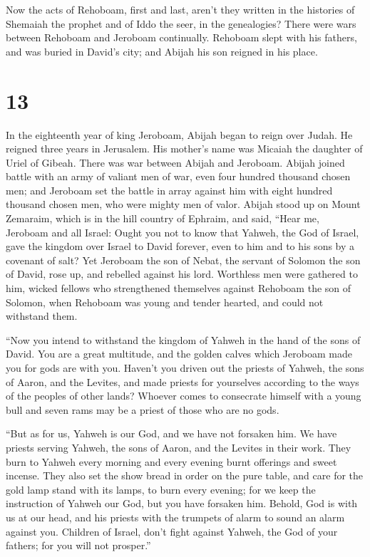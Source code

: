 Now the acts of Rehoboam, first and last, aren't they
written in the histories of Shemaiah the prophet and of Iddo the seer,
in the genealogies? There were wars between Rehoboam and Jeroboam
continually.  Rehoboam slept with his fathers, and was
buried in David's city; and Abijah his son reigned in his place.

\hypertarget{section-12}{%
\section{13}\label{section-12}}

 In the eighteenth year of king Jeroboam, Abijah began to
reign over Judah.  He reigned three years in Jerusalem.
His mother's name was Micaiah the daughter of Uriel of Gibeah. There was
war between Abijah and Jeroboam.  Abijah joined battle
with an army of valiant men of war, even four hundred thousand chosen
men; and Jeroboam set the battle in array against him with eight hundred
thousand chosen men, who were mighty men of valor.  Abijah
stood up on Mount Zemaraim, which is in the hill country of Ephraim, and
said, ``Hear me, Jeroboam and all Israel:  Ought you not
to know that Yahweh, the God of Israel, gave the kingdom over Israel to
David forever, even to him and to his sons by a covenant of salt?
 Yet Jeroboam the son of Nebat, the servant of Solomon the
son of David, rose up, and rebelled against his lord. 
Worthless men were gathered to him, wicked fellows who strengthened
themselves against Rehoboam the son of Solomon, when Rehoboam was young
and tender hearted, and could not withstand them.

 ``Now you intend to withstand the kingdom of Yahweh in
the hand of the sons of David. You are a great multitude, and the golden
calves which Jeroboam made you for gods are with you. 
Haven't you driven out the priests of Yahweh, the sons of Aaron, and the
Levites, and made priests for yourselves according to the ways of the
peoples of other lands? Whoever comes to consecrate himself with a young
bull and seven rams may be a priest of those who are no gods.

 ``But as for us, Yahweh is our God, and we have not
forsaken him. We have priests serving Yahweh, the sons of Aaron, and the
Levites in their work.  They burn to Yahweh every morning
and every evening burnt offerings and sweet incense. They also set the
show bread in order on the pure table, and care for the gold lamp stand
with its lamps, to burn every evening; for we keep the instruction of
Yahweh our God, but you have forsaken him.  Behold, God
is with us at our head, and his priests with the trumpets of alarm to
sound an alarm against you. Children of Israel, don't fight against
Yahweh, the God of your fathers; for you will not prosper.''

